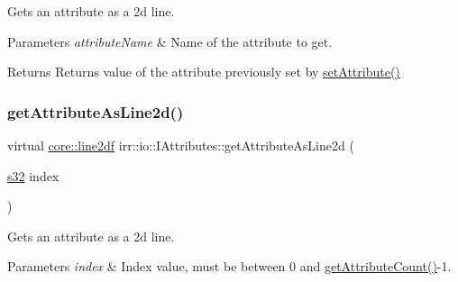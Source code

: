 Gets an attribute as a 2d line. 


\begin{DoxyParams}{Parameters}
{\em attribute\+Name} & Name of the attribute to get. \\
\hline
\end{DoxyParams}
\begin{DoxyReturn}{Returns}
Returns value of the attribute previously set by \hyperlink{classirr_1_1io_1_1IAttributes_a03fa31acb481ae23678676cc183f09a6}{set\+Attribute()} 
\end{DoxyReturn}
\mbox{\label{classirr_1_1io_1_1IAttributes_aa03235ad3ff3eb4468c424c171ee652f}} 
\subsubsection{\texorpdfstring{get\+Attribute\+As\+Line2d()}{getAttributeAsLine2d()}\hspace{0.1cm}{\footnotesize\ttfamily [3/4]}}
{\footnotesize\ttfamily virtual \hyperlink{namespaceirr_1_1core_aeb733b0cceca2d174bf42ad477566204}{core\+::line2df} irr\+::io\+::\+I\+Attributes\+::get\+Attribute\+As\+Line2d (\begin{DoxyParamCaption}\item[{\hyperlink{namespaceirr_ac66849b7a6ed16e30ebede579f9b47c6}{s32}}]{index }\end{DoxyParamCaption})\hspace{0.3cm}{\ttfamily [pure virtual]}}



Gets an attribute as a 2d line. 


\begin{DoxyParams}{Parameters}
{\em index} & Index value, must be between 0 and \hyperlink{classirr_1_1io_1_1IAttributes_a796bdd9440ee7ba0b6742a90a82870b6}{get\+Attribute\+Count()}-\/1. \\
\hline
\end{DoxyParams}
\mbox{\label{classirr_1_1io_1_1IAttributes_aa03235ad3ff3eb4468c424c171ee652f}} 
